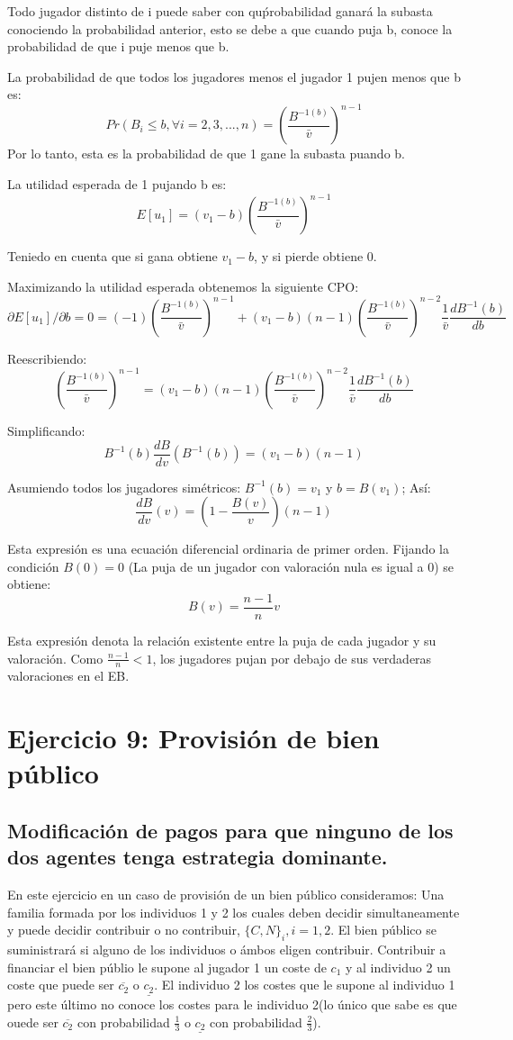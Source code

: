 \documentclass{article}
\begin{document}
Todo jugador distinto de i puede saber con qu\'probabilidad ganar\'a la subasta conociendo la probabilidad anterior, esto se debe a que cuando puja b, conoce la probabilidad de que i puje menos que b.

La probabilidad de que todos los jugadores menos el jugador 1 pujen menos que b es:
$$Pr(B_i\leq b, \forall i=2,3,...,n)=(\frac{B^{-1(b)}}{\bar{v}})^{n-1}$$
 Por lo tanto, esta es la probabilidad de que 1 gane la subasta puando b.

La utilidad esperada de 1 pujando b es:
$$E[u_1]=(v_1-b)(\frac{B^{-1(b)}}{\bar{v}})^{n-1}$$

Teniedo en cuenta que si gana obtiene $v_1-b$, y si pierde obtiene 0.

Maximizando la utilidad esperada obtenemos la siguiente CPO:
$$\partial E[u_1]/\partial b=0=(-1)(\frac{B^{-1(b)}}{\bar{v}})^{n-1}+(v_1-b)(n-1)(\frac{B^{-1(b)}}{\bar{v}})^{n-2}\frac{1}{\bar{v}}\frac{dB^{-1}(b)}{db}$$

Reescribiendo:
$$(\frac{B^{-1(b)}}{\bar{v}})^{n-1}=(v_1-b)(n-1)(\frac{B^{-1(b)}}{\bar{v}})^{n-2}\frac{1}{\bar{v}}\frac{dB^{-1}(b)}{db}$$

Simplificando:
$$B^{-1}(b)\frac{dB}{dv}(B^{-1}(b))=(v_1-b)(n-1)$$

Asumiendo todos los jugadores sim\'etricos: $B^{-1}(b)=v_1$ y $b=B(v_1)$; As\'i:
$$\frac{dB}{dv}(v)=(1-\frac{B(v)}{v})(n-1)$$

Esta expresi\'on es una ecuaci\'on diferencial ordinaria de primer orden. Fijando la condici\'on $B(0)=0$ (La puja de un jugador con valoraci\'on nula es igual a 0) se obtiene:
$$B(v)=\frac{n-1}{n}v$$

Esta expresi\'on denota la relaci\'on existente entre la puja de cada jugador y su valoraci\'on. Como $\frac{n-1}{n}<1$, los jugadores pujan por debajo de sus verdaderas valoraciones en el EB.



\section{Ejercicio 9: Provisi\'on de bien p\'ublico}
\subsection{Modificaci\'on de pagos para que ninguno de los dos agentes tenga estrategia dominante.}

En este ejercicio en un caso de provisión de un bien p\'ublico consideramos: Una familia formada por los individuos 1 y 2 los cuales deben decidir simultaneamente y puede decidir contribuir o no contribuir, $\{C,N\}_i, i=1,2$. El bien p\'ublico se suministrar\'a si alguno de los individuos o \'ambos eligen contribuir. Contribuir a financiar el bien p\'ublio le supone al jugador 1 un coste de $c_1$ y al individuo 2 un coste que puede ser $\overline{c_2}$ o $\underline{c_2}$. El individuo 2 los costes que le supone al individuo 1 pero este \'ultimo no conoce los costes para le individuo 2(lo único que sabe es que ouede ser $\overline{c_2}$ con probabilidad $\frac{1}{3}$ o $\underline{c_2}$ con probabilidad $\frac{2}{3}$).
\end{document}
